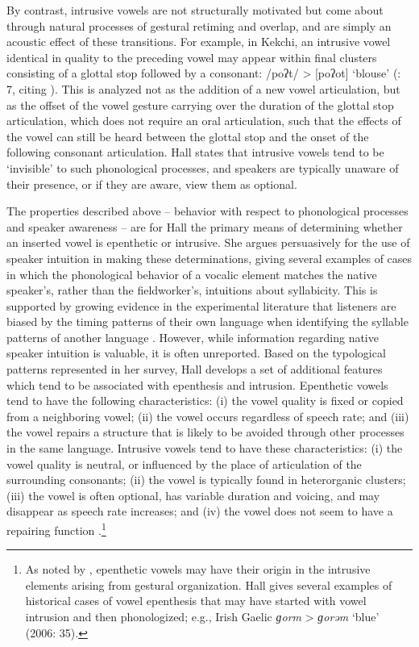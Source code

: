   By contrast, intrusive vowels are not structurally motivated but come about through natural processes of gestural retiming and overlap, and are simply an acoustic effect of these transitions. For example, in Kekchi, an intrusive vowel identical in quality to the preceding vowel may appear within final clusters consisting of a glottal stop followed by a consonant: /poʔt/ > [poʔot] ‘blouse’ (\citealt{Hall2006}: 7, citing \citealt{Campbell1974}). This is analyzed not as the addition of a new vowel articulation, but as the offset of the vowel gesture carrying over the duration of the glottal stop articulation, which does not require an oral articulation, such that the effects of the vowel can still be heard between the glottal stop and the onset of the following consonant articulation. Hall states that intrusive vowels tend to be ‘invisible’ to such phonological processes, and speakers are typically unaware of their presence, or if they are aware, view them as optional.

  The properties described above -- behavior with respect to phonological processes and speaker awareness -- are for Hall the primary means of determining whether an inserted vowel is epenthetic or intrusive. She argues persuasively for the use of speaker intuition in making these determinations, giving several examples of cases in which the phonological behavior of a vocalic element matches the native speaker’s, rather than the fieldworker’s, intuitions about syllabicity. This is supported by growing evidence in the experimental literature that listeners are biased by the timing patterns of their own language when identifying the syllable patterns of another language \citep{KwonEtAl2017}. However, while information regarding native speaker intuition is valuable, it is often unreported. Based on the typological patterns represented in her survey, Hall develops a set of additional features which tend to be associated with epenthesis and intrusion. Epenthetic vowels tend to have the following characteristics: (i) the vowel quality is fixed or copied from a neighboring vowel; (ii) the vowel occurs regardless of speech rate; and (iii) the vowel repairs a structure that is likely to be avoided through other processes in the same language. Intrusive vowels tend to have these characteristics: (i) the vowel quality is neutral, or influenced by the place of articulation of the surrounding consonants; (ii) the vowel is typically found in heterorganic clusters; (iii) the vowel is often optional, has variable duration and voicing, and may disappear as speech rate increases; and (iv) the vowel does not seem to have a repairing function \citep[391]{Hall2006}.\footnote{{As noted by \citet[53]{BrowmanGoldstein1992a}, epenthetic vowels may have their origin in the intrusive elements arising from gestural organization. Hall gives several examples of historical cases of vowel epenthesis that may have started with vowel intrusion and then phonologized; e.g., Irish Gaelic} \textrm{\textit{ɡorm}} > \textrm{\textit{ɡorəm}} \textrm{‘blue’ (2006: 35).}}

